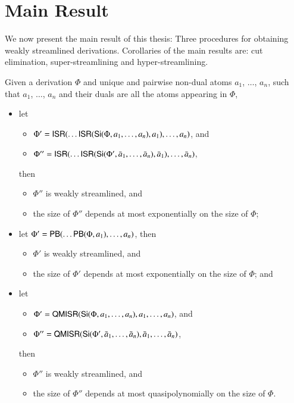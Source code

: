 \section{Main Result}\label{section:MainResult}

We now present the main result of this thesis: Three procedures for obtaining weakly streamlined derivations. Corollaries of the main results are: cut elimination, super-streamlining and hyper-streamlining.

\begin{theorem}\label{theorem:WeakStreamlining}
Given a derivation $\Phi$ and unique and pairwise non-dual atoms $a_1$, $\dots$, $a_n$, such that $a_1$, $\dots$, $a_n$ and their duals are all the atoms appearing in $\Phi$,
\begin{itemize}
\item let
\begin{itemize}
\item $\Phi'=\mathsf{ISR}(\dots\mathsf{ISR}(\mathsf{Si}(\Phi,a_1,\dots,a_n),a_1),\dots,a_n)$, and
\item $\Phi''=\mathsf{ISR}(\dots\mathsf{ISR}(\mathsf{Si}(\Phi',\bar a_1,\dots,\bar a_n),\bar a_1),\dots,\bar a_n)$,
\end{itemize}
then
\begin{itemize}
\item $\Phi''$ is weakly streamlined, and
\item the size of $\Phi''$ depends at most exponentially on the size of\/ $\Phi$;
\end{itemize}
\item let\/ $\Phi'=\mathsf{PB}(\dots\mathsf{PB}(\Phi,a_1),\dots,a_n)$, then
\begin{itemize}
\item $\Phi'$ is weakly streamlined, and
\item the size of\/ $\Phi'$ depends at most exponentially on the size of\/ $\Phi$; and
\end{itemize}
\item let
\begin{itemize}
\item $\Phi'=\mathsf{QMISR}(\mathsf{Si}(\Phi,a_1,\dots,a_n),a_1,\dots,a_n)$, and
\item $\Phi''=\mathsf{QMISR}(\mathsf{Si}(\Phi',\bar a_1,\dots,\bar a_n),\bar a_1,\dots,\bar a_n)$,
\end{itemize}
then
\begin{itemize}
\item $\Phi''$ is weakly streamlined, and
\item the size of\/ $\Phi''$ depends at most quasipolynomially on the size of\/ $\Phi$.
\end{itemize}
\end{itemize}
\end{theorem}

